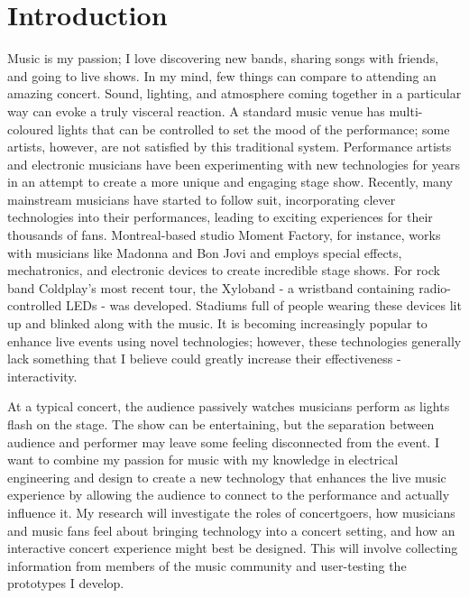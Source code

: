 \chapter{Introduction}

Music is my passion; I love discovering new bands, sharing songs with friends, and going to live shows. In my mind, few things can compare to attending an amazing concert. Sound, lighting, and atmosphere coming together in a particular way can evoke a truly visceral reaction. A standard music venue has multi-coloured lights that can be controlled to set the mood of the performance; some artists, however, are not satisfied by this traditional system. Performance artists and electronic musicians have been experimenting with new technologies for years in an attempt to create a more unique and engaging stage show. Recently, many mainstream musicians have started to follow suit, incorporating clever technologies into their performances, leading to exciting experiences for their thousands of fans. Montreal-based studio Moment Factory, for instance, works with musicians like Madonna and Bon Jovi and employs special effects, mechatronics, and electronic devices to create incredible stage shows. For rock band Coldplay's most recent tour, the Xyloband - a wristband containing radio-controlled LEDs - was developed. Stadiums full of people wearing these devices lit up and blinked along with the music. It is becoming increasingly popular to enhance live events using novel technologies; however, these technologies generally lack something that I believe could greatly increase their effectiveness - interactivity.

At a typical concert, the audience passively watches musicians perform as lights flash on the stage. The show can be entertaining, but the separation between audience and performer may leave some feeling disconnected from the event. I want to combine my passion for music with my knowledge in electrical engineering and design to create a new technology that enhances the live music experience by allowing the audience to connect to the performance and actually influence it. My research will investigate the roles of concertgoers, how musicians and music fans feel about bringing technology into a concert setting, and how an interactive concert experience might best be designed. This will involve collecting information from members of the music community and user-testing the prototypes I develop.